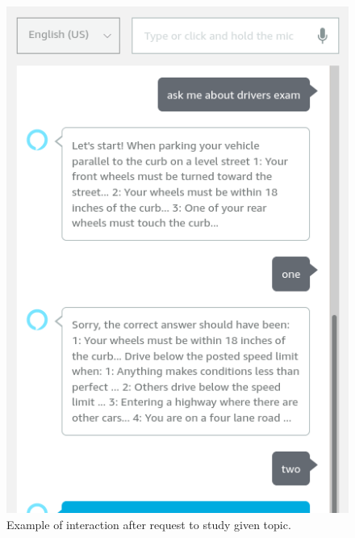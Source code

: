\begin{figure}[!tbp]
\begin{minipage}[b]{0.4\textwidth}
    \includegraphics[width=\textwidth]{images/app/studying_assistant/interaction1.png}
    \caption{Example of interaction after request to study given topic.}
    \label{fig:interaction}
  \end{minipage}
\end{figure}

